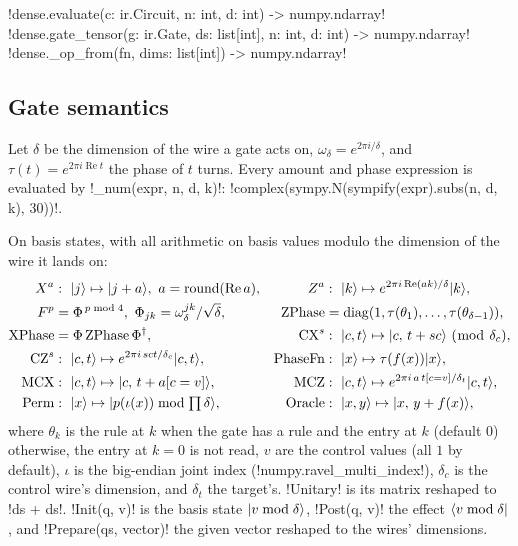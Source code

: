 \begin{signature}
\py!dense.evaluate(c: ir.Circuit, n: int, d: int) -> numpy.ndarray!\\
\py!dense.gate_tensor(g: ir.Gate, ds: list[int], n: int, d: int) -> numpy.ndarray!\\
\py!dense._op_from(fn, dims: list[int]) -> numpy.ndarray!
\end{signature}

\subsection{Gate semantics}

Let $\delta$ be the dimension of the wire a gate acts on, $\omega_\delta=e^{2\pi i/\delta}$, and $\tau(t)=e^{2\pi i\operatorname{Re}t}$ the phase of $t$ turns. Every amount and phase expression is evaluated by \py!_num(expr, n, d, k)!: \py!complex(sympy.N(sympify(expr).subs({n, d, k}), 30))!.

\begin{definition}\label{def:bench-tools-dense}
On basis states, with all arithmetic on basis values modulo the dimension of the wire it lands on:
\begin{align*}
X^a&:\ \ket{j}\mapsto\ket{j+a},\ a=\operatorname{round}(\operatorname{Re}a), &
Z^a&:\ \ket{k}\mapsto e^{2\pi i\operatorname{Re}(ak)/\delta}\ket{k},\\
F^p&=\Phi^{\,p\bmod4},\ \Phi_{jk}=\omega_\delta^{jk}/\sqrt\delta, &
\mathrm{ZPhase}&=\operatorname{diag}(1,\tau(\theta_1),\ldots,\tau(\theta_{\delta-1})),\\
\mathrm{XPhase}&=\Phi\,\mathrm{ZPhase}\,\Phi^\dagger, &
\mathrm{CX}^s&:\ \ket{c,t}\mapsto\ket{c,\,t+sc}\ (\bmod\ \delta_c),\\
\mathrm{CZ}^s&:\ \ket{c,t}\mapsto e^{2\pi i\,sct/\delta_c}\ket{c,t}, &
\mathrm{PhaseFn}&:\ \ket{x}\mapsto\tau(f(x))\ket{x},\\
\mathrm{MCX}&:\ \ket{c,t}\mapsto\ket{c,\,t+a[c=v]}, &
\mathrm{MCZ}&:\ \ket{c,t}\mapsto e^{2\pi i\,a\,t[c=v]/\delta_t}\ket{c,t},\\
\mathrm{Perm}&:\ \ket{x}\mapsto\ket{p(\iota(x))\bmod\textstyle\prod\delta}, &
\mathrm{Oracle}&:\ \ket{x,y}\mapsto\ket{x,\,y+f(x)},
\end{align*}
where $\theta_k$ is the rule at $k$ when the gate has a rule and the entry at $k$ (default $0$) otherwise, the entry at $k=0$ is not read, $v$ are the control values (all $1$ by default), $\iota$ is the big-endian joint index (\py!numpy.ravel_multi_index!), $\delta_c$ is the control wire's dimension, and $\delta_t$ the target's. \py!Unitary! is its matrix reshaped to \py!ds + ds!. \py!Init(q, v)! is the basis state $\lvert v\bmod\delta \rangle$, \py!Post(q, v)! the effect $\langle v\bmod\delta \rvert$, and \py!Prepare(qs, vector)! the given vector reshaped to the wires' dimensions.
\end{definition}

